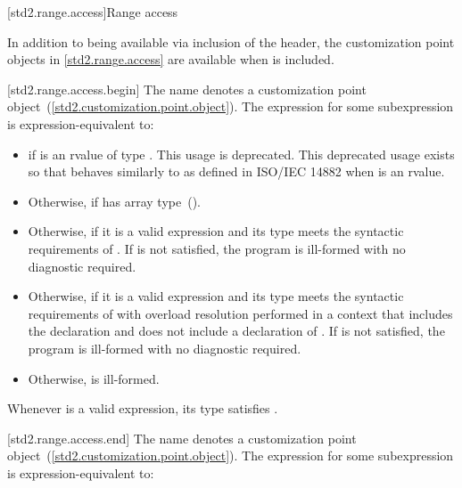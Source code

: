 [std2.range.access]{Range access}

\pnum
In addition to being available via inclusion of the 
header, the customization point objects in \ref{std2.range.access} are
available when  is included.

[std2.range.access.begin]{}
\pnum
The name  denotes a customization point
 object~(\ref{std2.customization.point.object}). The expression
 for some subexpression  is expression-equivalent to:

\begin{itemize}
\item
   if  is an rvalue of
  type . This usage is deprecated.
  \enternote This deprecated usage exists so that
   behaves similarly to 
  as defined in ISO/IEC 14882 when  is an rvalue. \exitnote

\item
  Otherwise,  if  has array
  type~().

\item
  Otherwise,  if it is a valid expression and its type  meets the
  syntactic requirements of . If
   is not satisfied, the program is ill-formed
  with no diagnostic required.

\item
  Otherwise,  if it is a valid expression and its type  meets the
  syntactic requirements of  with overload
  resolution performed in a context that includes the declaration
   and does not include
  a declaration of . If 
  is not satisfied, the program is ill-formed with no diagnostic
  required.

\item
  Otherwise,  is ill-formed.
\end{itemize}

\pnum
\enternote Whenever  is a valid expression, its
type satisfies . \exitnote

[std2.range.access.end]{}
\pnum
The name  denotes a customization point
object~(\ref{std2.customization.point.object}). The expression
 for some subexpression  is expression-equivalent to:

